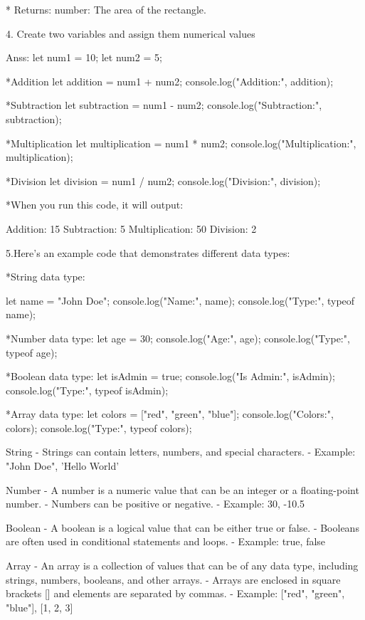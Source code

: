 * Returns:
    number: The area of the rectangle.

4. Create two variables and assign them numerical values

Anss:
let num1 = 10;
let num2 = 5;

*Addition
let addition = num1 + num2;
console.log("Addition:", addition);

*Subtraction
let subtraction = num1 - num2;
console.log("Subtraction:", subtraction);

*Multiplication
let multiplication = num1 * num2;
console.log("Multiplication:", multiplication);

*Division
let division = num1 / num2;
console.log("Division:", division);

*When you run this code, it will output:


Addition: 15
Subtraction: 5
Multiplication: 50
Division: 2

5.Here's an example code that demonstrates different data types:


*String data type:

let name = "John Doe";
console.log("Name:", name);
console.log("Type:", typeof name);

*Number data type:
let age = 30;
console.log("Age:", age);
console.log("Type:", typeof age);

*Boolean data type:
let isAdmin = true;
console.log("Is Admin:", isAdmin);
console.log("Type:", typeof isAdmin);

*Array data type:
let colors = ["red", "green", "blue"];
console.log("Colors:", colors);
console.log("Type:", typeof colors);


     
String
-      Strings can contain letters, numbers, and special characters.
-      Example: "John Doe", 'Hello World'

Number
-      A number is a numeric value that can be an integer or a floating-point number.
-      Numbers can be positive or negative.
-      Example: 30, -10.5

Boolean
-      A boolean is a logical value that can be either true or false.
-      Booleans are often used in conditional statements and loops.
-      Example: true, false

Array
-      An array is a collection of values that can be of any data type, including strings, numbers, booleans, and other arrays.
-      Arrays are enclosed in square brackets [] and elements are separated by commas.
-      Example: ["red", "green", "blue"], [1, 2, 3]



